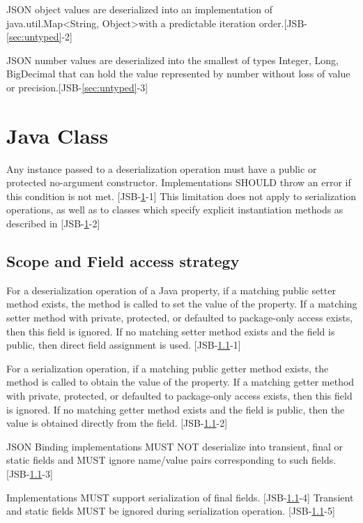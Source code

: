 JSON object values are deserialized into an implementation of java.util.Map\textless String, Object\textgreater\space with a predictable iteration order.[JSB-\ref{sec:untyped}-2]

JSON number values are deserialized into the smallest of types Integer, Long, BigDecimal that can hold the value represented by number without loss of value or precision.[JSB-\ref{sec:untyped}-3]

\section{Java Class}
\label{sec:class}
Any instance passed to a deserialization operation must have a public or protected no-argument constructor. Implementations SHOULD throw an error if this condition is not met. [JSB-\ref{sec:class}-1] This limitation does not apply to serialization operations, as well as to classes which specify explicit instantiation methods as described in  [JSB-\ref{sec:class}-2]

\subsection{Scope and Field access strategy}
\label{subsec:fieldstrategy}
For a deserialization operation of a Java property, if a matching public setter method exists, the method is called to set the value of the property. 
If a matching setter method with private, protected, or defaulted to package-only access exists, then this field is ignored. 
If no matching setter method exists and the field is public, then direct field assignment is used. [JSB-\ref{subsec:fieldstrategy}-1]

For a serialization operation, if a matching public getter method exists, the method is called to obtain the value of the property. 
If a matching getter method with private, protected, or defaulted to package-only access exists, then this field is ignored. 
If no matching getter method exists and the field is public, then the value is obtained directly from the field. [JSB-\ref{subsec:fieldstrategy}-2]

JSON Binding implementations MUST NOT deserialize into transient, final or static fields and MUST ignore name/value pairs corresponding to such fields. [JSB-\ref{subsec:fieldstrategy}-3]

Implementations MUST support serialization of final fields. [JSB-\ref{subsec:fieldstrategy}-4] Transient and static fields MUST be ignored during serialization operation. [JSB-\ref{subsec:fieldstrategy}-5]


